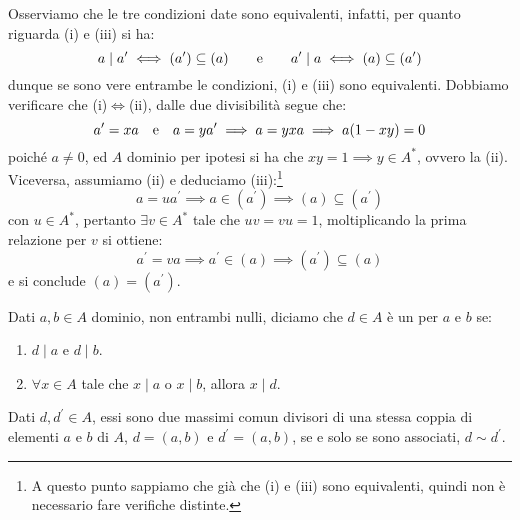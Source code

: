 \documentclass[11pt]{scrartcl}
\begin{document}
\begin{remark}
    Osserviamo che le tre condizioni date sono equivalenti, infatti, per quanto riguarda (i) e (iii) si ha:
    \[ a \mid a^{\prime} \iff (a^{\prime}) \subseteq (a) \qquad \text e \qquad a^{\prime}\mid a \iff (a) \subseteq (a^{\prime})
        \]
    dunque se sono vere entrambe le condizioni, (i) e (iii) sono equivalenti. Dobbiamo verificare che (i)$\iff$(ii), dalle due divisibilità segue che:
    \[ a^{\prime} = xa \quad \text e \quad a = y a^{\prime} \implies a = yxa \implies a(1-xy) = 0
        \]
    poiché $a \ne 0$, ed $A$ dominio per ipotesi si ha che $xy = 1 \implies y \in A^*$, ovvero la (ii). Viceversa, assumiamo (ii) e deduciamo 
    (iii):\footnote{A questo punto sappiamo che già che (i) e (iii) sono equivalenti, quindi non è necessario fare verifiche distinte.}
    \[ a = ua^{\prime} \implies a \in (a^{\prime}) \implies (a) \subseteq (a^{\prime})
        \]
    con $u \in A^*$, pertanto $\exists v \in A^*$ tale che $uv = vu = 1$, moltiplicando la prima relazione per $v$ si ottiene:
    \[ a^{\prime} = va \implies a^{\prime} \in (a) \implies (a^{\prime}) \subseteq (a)
        \]
    e si conclude $(a) = (a^{\prime})$.
\end{remark}

\begin{definition}
    Dati $a,b \in A$ dominio, non entrambi nulli, diciamo che $d \in A$ è un  per $a$ e $b$ se:
    \begin{enumerate}[(1)]
        \item $d \mid a$ e $d \mid b$.
        \item $\forall x \in A$ tale che $x \mid a$ o $x\mid b$, allora $x \mid d$.
    \end{enumerate}
\end{definition}

\begin{proposition}
    Dati $d,d^{\prime} \in A$, essi sono due massimi comun divisori di una stessa coppia di elementi $a$ e $b$ di $A$, $d=(a,b)$ e $d^{\prime} = (a,b)$, se e solo se sono associati, $d \sim d^{\prime}$.
\end{proposition}
\end{document}

